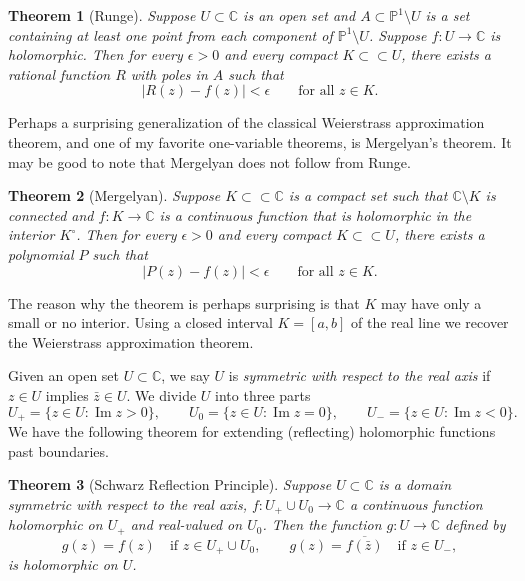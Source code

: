 \documentclass[12pt,openany]{book}
\renewcommand{\Im}{\operatorname{Im}}
\newcommand{\sabs}[1]{\lvert {#1} \rvert}
\newcommand{\C}{{\mathbb{C}}}
\newcommand{\bP}{{\mathbb{P}}}
\newcommand{\myindex}[1]{#1\index{#1}}
\theoremstyle{plain}
\newtheorem{thm}{Theorem}[section]
\theoremstyle{remark}
\theoremstyle{definition}
\theoremstyle{exercise}
\theoremstyle{example}
\begin{document}
\begin{thm}[Runge]
Suppose $U \subset \C$ is an open set and $A \subset \bP^1 \setminus U$
is a set containing at least one point from each component of
$\bP^1 \setminus U$.  Suppose $f \colon U \to \C$ is holomorphic.
Then for every $\epsilon > 0$ and every compact
$K \subset \subset U$, there exists a rational function $R$ with poles in $A$
such that
\begin{equation*}
\sabs{R(z) - f(z)} < \epsilon \qquad \text{for all $z \in K$}.
\end{equation*}
\end{thm}

Perhaps a surprising generalization of the
classical Weierstrass approximation theorem,
and one of my favorite one-variable theorems,
is Mergelyan's theorem.
It may be good to note that Mergelyan does not follow from Runge.

\begin{thm}[Mergelyan] \label{thm:mergelyan}
Suppose $K \subset \subset \C$ is a compact set such that $\C \setminus K$
is connected and
$f \colon K \to \C$ is a continuous function that is
holomorphic in the interior $K^\circ$.
Then for every $\epsilon > 0$ and every compact
$K \subset \subset U$, there exists a polynomial $P$
such that
\begin{equation*}
\sabs{P(z) - f(z)} < \epsilon \qquad \text{for all $z \in K$}.
\end{equation*}
\end{thm}

The reason why the theorem is perhaps
surprising is that $K$ may have only a
small or no interior.  Using a closed interval $K=[a,b]$ of the real line we
recover the Weierstrass approximation theorem.

\medskip

Given an open set $U \subset \C$, we say $U$ is
\emph{\myindex{symmetric with respect to the real axis}} if
$z \in U$ implies $\bar{z} \in U$.  We divide $U$ into
three parts
\begin{equation*}
U_+ = \{ z \in U : \Im z > 0 \}, \qquad
U_0 = \{ z \in U : \Im z = 0 \}, \qquad
U_- = \{ z \in U : \Im z < 0 \}.
\end{equation*}
We have the following theorem for extending (reflecting) holomorphic functions past
boundaries.

\begin{thm}[Schwarz Reflection Principle]
%
Suppose $U \subset \C$ is a domain symmetric with respect to the real axis,
$f \colon U_+ \cup U_0 \to \C$ a continuous function holomorphic on $U_+$
and real-valued on $U_0$.  Then the function $g \colon U \to \C$
defined by
\begin{equation*}
g(z) = f(z) \quad \text{if $z \in U_+ \cup U_0$},
\qquad
g(z) =
\overline{f(\bar{z})} \quad \text{if $z \in U_-$},
\end{equation*}
is holomorphic on $U$.
\end{thm}
\end{document}
